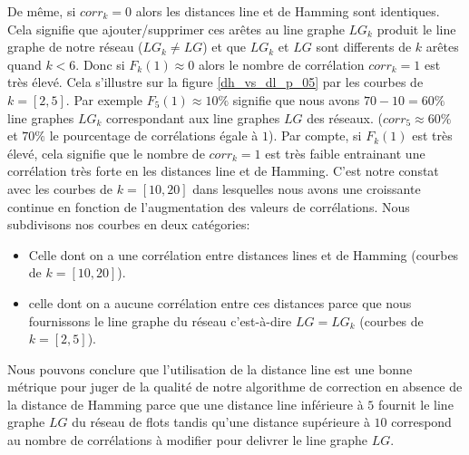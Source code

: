 \documentclass[onecolumn, 12pt]{book}
\begin{document}
De m\^eme, si $corr_k = 0$ alors les distances line et de Hamming sont identiques. Cela signifie que ajouter/supprimer ces ar\^etes au line graphe $LG_k$ produit le line graphe de notre r\'eseau ($LG_{k} \neq LG$) et que $LG_{k}$ et $LG$ sont differents de $k$ ar\^etes quand $k < 6$.
\newline
Donc si $F_k(1) \approx 0$ alors le nombre de corr\'elation $corr_k = 1$ est tr\`es \'elev\'e. Cela s'illustre sur la figure \ref{dh_vs_dl_p_05} par les courbes de $k=[2,5]$. 
Par exemple $F_5(1) \approx 10\%$ signifie que nous avons $70-10=60\%$ line graphes $LG_k$ correspondant aux line graphes $LG$ des r\'eseaux. ($corr_5 \approx 60\%$ et $70\%$ le pourcentage de corr\'elations \'egale \`a $1$).
\newline
Par compte, si  $F_k(1)$ est tr\`es \'elev\'e, cela signifie que le nombre de $corr_k = 1$ est tr\`es faible entrainant une corr\'elation tr\`es forte en les distances line et de Hamming.
C'est notre constat avec les courbes de $k = [10,20]$ dans lesquelles nous avons une  croissante continue en fonction de l'augmentation des valeurs de corr\'elations.
\newline
Nous subdivisons nos courbes en deux cat\'egories:
\begin{itemize}
	\item Celle dont on a une corr\'elation entre distances lines et de Hamming (courbes de $k = [10,20]$).
	\item celle dont on a aucune corr\'elation entre ces distances parce que nous fournissons le line graphe du r\'eseau c'est-\`a-dire  $LG = LG_k$ (courbes de $k = [2,5]$). 
\end{itemize}
Nous pouvons conclure que l'utilisation de la distance line est une bonne m\'etrique pour juger de la qualit\'e de notre algorithme de correction en absence de la distance de Hamming parce que une distance line inf\'erieure \`a $5$ fournit le line graphe $LG$ du r\'eseau de flots tandis qu'une distance sup\'erieure \`a $10$ correspond au nombre de corr\'elations \`a modifier pour delivrer le line graphe $LG$. 
\end{document}
